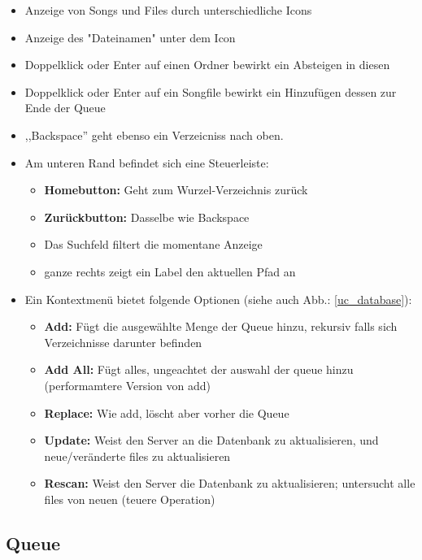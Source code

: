 \begin{itemize}
    \item Anzeige von Songs und Files durch unterschiedliche Icons
    \item Anzeige des "Dateinamen" unter dem Icon
    \item Doppelklick oder Enter auf einen Ordner bewirkt ein Absteigen in diesen
    \item Doppelklick oder Enter auf ein Songfile bewirkt ein Hinzufügen dessen zur Ende der Queue
    \item ,,Backspace'' geht ebenso ein Verzeicniss nach oben.
    \item Am unteren Rand befindet sich eine Steuerleiste:
        \begin{itemize}
            \item \textbf{Homebutton:} Geht zum Wurzel-Verzeichnis zurück
            \item \textbf{Zurückbutton:} Dasselbe wie Backspace
            \item Das Suchfeld filtert die momentane Anzeige
            \item ganze rechts zeigt ein Label den aktuellen Pfad an
        \end{itemize}
    \item Ein Kontextmenü bietet folgende Optionen (siehe auch Abb.: \ref{uc_database}):
        \begin{itemize}
            \item \textbf{Add:} Fügt die ausgewählte Menge der Queue hinzu, rekursiv falls sich Verzeichnisse darunter befinden
            \item \textbf{Add All:} Fügt alles, ungeachtet der auswahl der queue hinzu (performamtere Version von add)
            \item \textbf{Replace:} Wie add, löscht aber vorher die Queue
            \item \textbf{Update:} Weist den Server an die Datenbank zu aktualisieren, und neue/veränderte files zu aktualisieren
            \item \textbf{Rescan:} Weist den Server die Datenbank zu aktualisieren; untersucht alle files von neuen (teuere Operation)
        \end{itemize}
\end{itemize}


\subsection{Queue}

